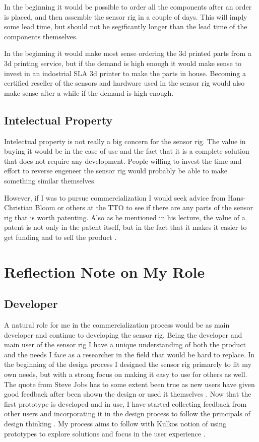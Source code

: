 \documentclass{iopconfser}
\begin{document}
In the beginning it would be possible to order all the components after an order is placed, and then assemble the sensor rig in a couple of days.
This will imply some lead time, but should not be segificantly longer than the lead 
time of the components themselves.

In the beginning it would make most sense ordering the 3d printed parts from a 3d printing service, but if the demand is high enough it would make sense to invest in an indostrial SLA 3d printer to make the parts in house.
Becoming a certified reseller of the sensors and hardware used in the sensor rig would also make sense after a while if the demand is high enough.

\subsection*{Intelectual Property}
Intelectual property is not really a big concern for the sensor rig.
The value in buying it would be in the ease of use and the fact that it is a complete solution that does not require any development.
People willing to invest the time and effort to reverse engeneer the sensor rig would probably be able to make something similar themselves.

However, if I was to pursue commercialization I would seek advice from Hans-Christian Bloom or others at the TTO to see if there are any parts of the sensor rig that is worth patenting.
Also as he mentioned in his lecture, the value of a patent is not only in the patent itself, but in the fact that it makes it easier to get funding and to sell the product \cite{blomIntelectualProperty2024}.

\section*{Reflection Note on My Role}

\subsection*{Developer}
A natural role for me in the commercialization process would be as main developer and continue to developing the sensor rig.
Being the developer and main user of the sensor rig I have a unique understanding of both the product and the needs I face as a researcher in the field that would be hard to replace.
In the beginning of the design process I designed the sensor rig primarely to fit my own needs, but with a strong focus on making it easy to use for others as well.
The quote from Steve Jobs  has to some extent been true as new users have given good feedback after been shown the design or used it themselves \cite{jobsInterviewSteveJobs1998}.
Now that the first prototype is developed and in use, I have started collecting feedback from other users and incorporating it in the design process to follow the principals of design thinking \cite{sorheimUnderstandingValueUsers2024}.
My process aims to follow with Kulkos notion of using prototypes to explore solutions and focus in the user experience \cite{kolkoDesignThinkingComes2015}.
\end{document}
